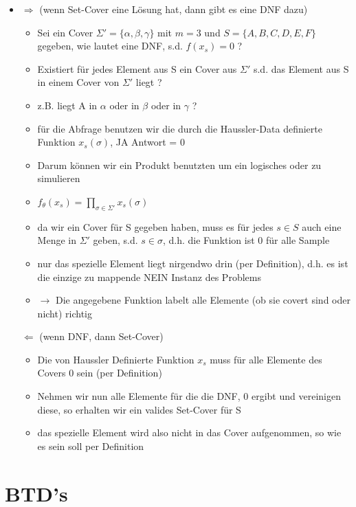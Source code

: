 \documentclass[12pt,a4paper]{article}
\begin{document}
\begin{itemize}
\item $\Rightarrow$ (wenn Set-Cover eine Lösung hat, dann gibt es eine DNF dazu)
\begin{itemize}
\item Sei ein Cover $\Sigma' = \{\alpha, \beta, \gamma \}$ mit $m=3$ und $S=\{A,B,C,D,E,F\}$ gegeben, wie lautet eine DNF, s.d. $f(x_s) = 0$ ?
\item Existiert für jedes Element aus S ein Cover aus $\Sigma'$ s.d. das Element aus S in einem Cover von $\Sigma'$ liegt ?
\item z.B. liegt A in $\alpha$ oder in $\beta$ oder in $\gamma$ ?
\item für die Abfrage benutzen wir die durch die Haussler-Data definierte Funktion $x_s(\sigma)$, JA Antwort = 0
\item Darum können wir ein Produkt benutzten um ein logisches oder zu simulieren
\item $\displaystyle f_\theta(x_s) = \prod_{\sigma\in\Sigma'} x_s(\sigma)$
\item da wir ein Cover für S gegeben haben, muss es für jedes $s\in S$ auch eine Menge in $\Sigma'$ geben, s.d. $s\in\sigma$, d.h. die Funktion ist 0 für alle Sample
\item nur das spezielle Element liegt nirgendwo drin (per Definition), d.h. es ist die einzige zu mappende NEIN Instanz des Problems
\item $\rightarrow$ Die angegebene Funktion labelt alle Elemente (ob sie covert sind oder nicht) richtig
\end{itemize}
$\Leftarrow$ (wenn DNF, dann Set-Cover)
\begin{itemize}
\item Die von Haussler Definierte Funktion $x_s$ muss für alle Elemente des Covers 0 sein (per Definition)
\item Nehmen wir nun alle Elemente für die die DNF, 0 ergibt und vereinigen diese, so erhalten wir ein valides Set-Cover für S
\item das spezielle Element wird also nicht in das Cover aufgenommen, so wie es sein soll per Definition
\end{itemize}
\end{itemize}



\section{BTD's}
\end{document}
